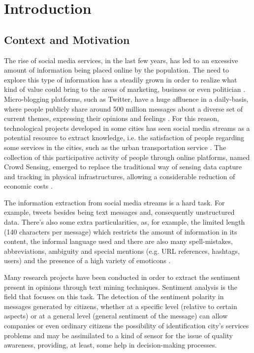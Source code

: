 \chapter{Introduction} \label{chap:intro}

\minitoc \mtcskip \noindent

\section{Context and Motivation} \label{sec:context}
The rise of social media services, in the last few years, has led to an excessive amount of information being placed online by the population. The need to explore this type of information has a steadily grown in order to realize what kind of value could bring to the areas of marketing, business or even politician \cite{kn:Feldman:2013}. Micro-blogging platforms, such as Twitter, have a huge affluence in a daily-basis, where people publicly share around 500 million messages about a diverse set of current themes, expressing their opinions and feelings \cite{kn:Giachanou2016}. For this reason, technological projects developed in some cities has seen social media streams as a potential resource to extract knowledge, i.e. the satisfaction of people regarding some services in the cities, such as the urban transportation service \cite{kn:Anastasi2013}. The collection of this participative activity of people through online platforms, named Crowd Sensing, emerged to replace the traditional way of sensing data capture and tracking in physical infrastructures, allowing a considerable reduction of economic costs \cite{kn:Szabo2013}.

The information extraction from social media streams is a hard task. For example, tweets besides being text messages and, consequently unstructured data. There's also some extra particularities, as, for example, the limited length (140 characters per message) which restricts the amount of information in its content, the informal language used and there are also many spell-mistakes, abbreviations, ambiguity and special mentions (e.g. URL references, hashtags, users) and the presence of a high variety of emoticons \cite{kn:Musto2015}.

Many research projects have been conducted in order to extract the sentiment present in opinions through text mining techniques. Sentiment analysis is the field that focuses on this task. The detection of the sentiment polarity in messages generated by citizens, whether at a specific level (relative to certain aspects) or at a general level (general sentiment of the message) can allow companies or even ordinary citizens the possibility of identification city's services problems and may be assimilated to a kind of sensor for the issue of quality awareness, providing, at least, some help in decision-making processes.

